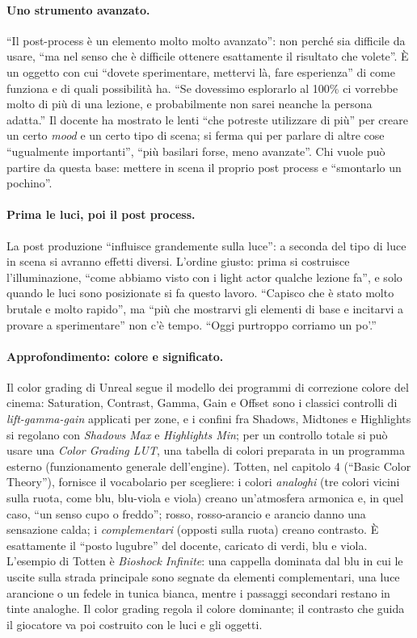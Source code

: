 \paragraph{Uno strumento avanzato.} ``Il post-process è un elemento molto molto avanzato'':
non perché sia difficile da usare, ``ma nel senso che è difficile ottenere esattamente il
risultato che volete''. È un oggetto con cui ``dovete sperimentare, mettervi là, fare
esperienza'' di come funziona e di quali possibilità ha. ``Se dovessimo esplorarlo al 100\%
ci vorrebbe molto di più di una lezione, e probabilmente non sarei neanche la persona adatta.''
Il docente ha mostrato le lenti ``che potreste utilizzare di più'' per creare un certo
\emph{mood} e un certo tipo di scena; si ferma qui per parlare di altre cose ``ugualmente
importanti'', ``più basilari forse, meno avanzate''. Chi vuole può partire da questa base:
mettere in scena il proprio post process e ``smontarlo un pochino''.

\paragraph{Prima le luci, poi il post process.} La post produzione ``influisce grandemente
sulla luce'': a seconda del tipo di luce in scena si avranno effetti diversi. L'ordine giusto:
prima si costruisce l'illuminazione, ``come abbiamo visto con i light actor qualche lezione
fa'', e solo quando le luci sono posizionate si fa questo lavoro. ``Capisco che è stato molto
brutale e molto rapido'', ma ``più che mostrarvi gli elementi di base e incitarvi a provare a
sperimentare'' non c'è tempo. ``Oggi purtroppo corriamo un po'.''

\paragraph{Approfondimento: colore e significato.} Il color grading di Unreal segue il
modello dei programmi di correzione colore del cinema: Saturation, Contrast, Gamma, Gain e
Offset sono i classici controlli di \emph{lift-gamma-gain} applicati per zone, e i confini
fra Shadows, Midtones e Highlights si regolano con \emph{Shadows Max} e \emph{Highlights Min};
per un controllo totale si può usare una \emph{Color Grading LUT}, una tabella di colori
preparata in un programma esterno (funzionamento generale dell'engine). Totten, nel capitolo 4
(``Basic Color Theory''), fornisce il vocabolario per scegliere: i colori \emph{analoghi}
(tre colori vicini sulla ruota, come blu, blu-viola e viola) creano un'atmosfera armonica e,
in quel caso, ``un senso cupo o freddo''; rosso, rosso-arancio e arancio danno una sensazione
calda; i \emph{complementari} (opposti sulla ruota) creano contrasto. È esattamente il
``posto lugubre'' del docente, caricato di verdi, blu e viola. L'esempio di Totten è
\emph{Bioshock Infinite}: una cappella dominata dal blu in cui le uscite sulla strada
principale sono segnate da elementi complementari, una luce arancione o un fedele in tunica
bianca, mentre i passaggi secondari restano in tinte analoghe. Il color grading regola il
colore dominante; il contrasto che guida il giocatore va poi costruito con le luci e gli
oggetti.

